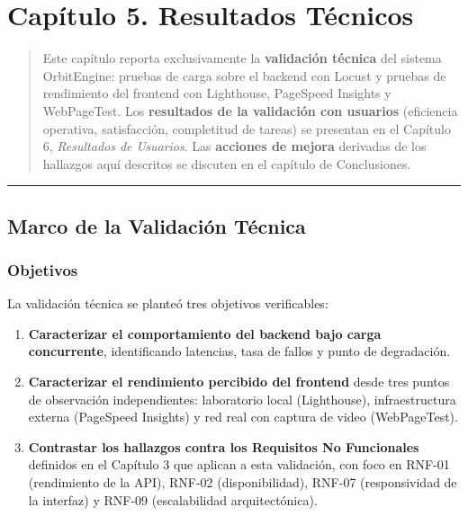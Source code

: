 \chapter{Capítulo 5. Resultados Técnicos}\label{capuxedtulo-5.-resultados-tuxe9cnicos}

\begin{quote}
Este capítulo reporta exclusivamente la \textbf{validación técnica} del sistema OrbitEngine: pruebas de carga sobre el backend con Locust y pruebas de rendimiento del frontend con Lighthouse, PageSpeed Insights y WebPageTest. Los \textbf{resultados de la validación con usuarios} (eficiencia operativa, satisfacción, completitud de tareas) se presentan en el Capítulo 6, \emph{Resultados de Usuarios}. Las \textbf{acciones de mejora} derivadas de los hallazgos aquí descritos se discuten en el capítulo de Conclusiones.
\end{quote}

\begin{center}\rule{0.5\linewidth}{0.5pt}\end{center}

\section{Marco de la Validación Técnica}\label{marco-de-la-validaciuxf3n-tuxe9cnica}

\subsection{Objetivos}\label{objetivos}

La validación técnica se planteó tres objetivos verificables:

\begin{enumerate}
\def\labelenumi{\arabic{enumi}.}
\tightlist
\item
  \textbf{Caracterizar el comportamiento del backend bajo carga concurrente}, identificando latencias, tasa de fallos y punto de degradación.
\item
  \textbf{Caracterizar el rendimiento percibido del frontend} desde tres puntos de observación independientes: laboratorio local (Lighthouse), infraestructura externa (PageSpeed Insights) y red real con captura de video (WebPageTest).
\item
  \textbf{Contrastar los hallazgos contra los Requisitos No Funcionales} definidos en el Capítulo 3 que aplican a esta validación, con foco en RNF-01 (rendimiento de la API), RNF-02 (disponibilidad), RNF-07 (responsividad de la interfaz) y RNF-09 (escalabilidad arquitectónica).
\end{enumerate}

